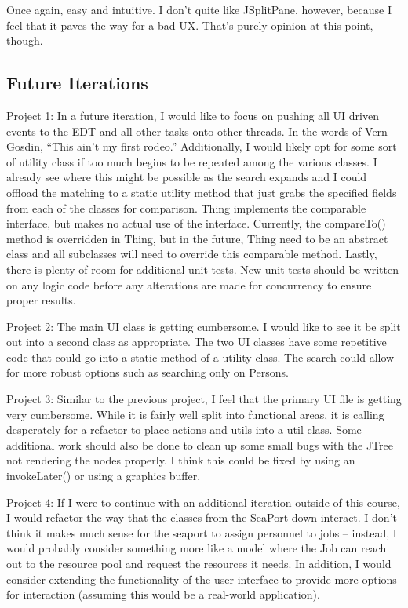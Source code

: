 \documentclass[english,floatsintext,man]{apa6}
\begin{document}
Once again, easy and intuitive. I don't quite like JSplitPane, however,
because I feel that it paves the way for a bad UX. That's purely opinion
at this point, though.

\subsection{Future Iterations}\label{future-iterations}

Project 1: In a future iteration, I would like to focus on pushing all
UI driven events to the EDT and all other tasks onto other threads. In
the words of Vern Gosdin, \enquote{This ain't my first rodeo.}
Additionally, I would likely opt for some sort of utility class if too
much begins to be repeated among the various classes. I already see
where this might be possible as the search expands and I could offload
the matching to a static utility method that just grabs the specified
fields from each of the classes for comparison. Thing implements the
comparable interface, but makes no actual use of the interface.
Currently, the compareTo() method is overridden in Thing, but in the
future, Thing need to be an abstract class and all subclasses will need
to override this comparable method. Lastly, there is plenty of room for
additional unit tests. New unit tests should be written on any logic
code before any alterations are made for concurrency to ensure proper
results.

Project 2: The main UI class is getting cumbersome. I would like to see
it be split out into a second class as appropriate. The two UI classes
have some repetitive code that could go into a static method of a
utility class. The search could allow for more robust options such as
searching only on Persons.

Project 3: Similar to the previous project, I feel that the primary UI
file is getting very cumbersome. While it is fairly well split into
functional areas, it is calling desperately for a refactor to place
actions and utils into a util class. Some additional work should also be
done to clean up some small bugs with the JTree not rendering the nodes
properly. I think this could be fixed by using an invokeLater() or using
a graphics buffer.

Project 4: If I were to continue with an additional iteration outside of
this course, I would refactor the way that the classes from the SeaPort
down interact. I don't think it makes much sense for the seaport to
assign personnel to jobs -- instead, I would probably consider something
more like a model where the Job can reach out to the resource pool and
request the resources it needs. In addition, I would consider extending
the functionality of the user interface to provide more options for
interaction (assuming this would be a real-world application).
\end{document}
